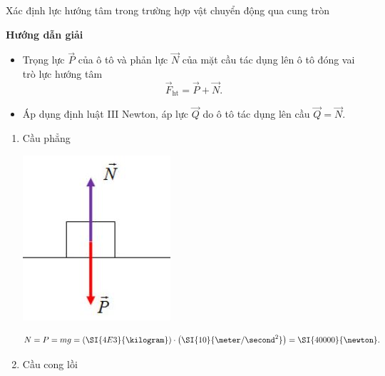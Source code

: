 \begin{dang}{Xác định lực hướng tâm trong trường hợp vật chuyển động qua cung tròn}
	{	\begin{center}
			\textbf{Hướng dẫn giải}
		\end{center}
		
		\begin{itemize}
			\item Trọng lực $\vec P$ của ô tô và phản lực $\vec N$ của mặt cầu tác dụng lên ô tô đóng vai trò lực hướng tâm 
			\begin{equation*}
				\vec{F}_{\text{ht}} = \vec{P} +\vec{N}.
			\end{equation*}
			\item Áp dụng định luật III Newton, áp lực $\vec Q$ do ô tô tác dụng lên cầu $\vec Q=\vec N$.
		\end{itemize}
	\begin{enumerate}[label=\alph*)]
		\item Cầu phẳng
		\begin{center}
			\includegraphics[scale=0.5]{../figs/VN10-PH-16-L-013-1-V2-01.JPG}
		\end{center}
		\begin{equation*}
		 N=P=mg=\left(\SI{4E3}{\kilogram}\right)\cdot\left(\SI{10}{\meter/\second^2}\right)=\SI{40000}{\newton}.
		\end{equation*}
	\item Cầu cong lồi
	\begin{center}

\end{center}
\end{enumerate}}
\end{dang}

